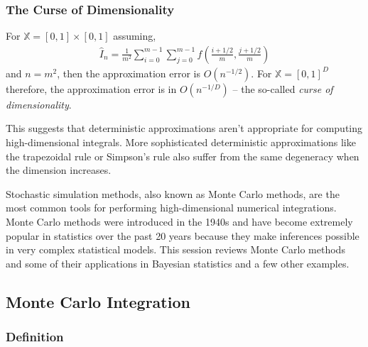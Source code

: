 \documentclass[11pt,a4paper]{article}
\begin{document}
\subsubsection{The Curse of Dimensionality}

For \(\mathbb{X}=[0,1] \times [0,1]\)
assuming,
\begin{align}
{\widehat{I}}_{n} = 
\frac{1}{m^{2}}\sum_{i = 0}^{m - 1}{\sum_{j = 0}^{m - 1}{f\left( \frac{i + 1/2}{m},\frac{j + 1/2}{m} \right)}}
\end{align}
and \(n=m^{2}\), 
then the approximation error is \(O\left( n^{- 1/2} \right)\). 
For \(\mathbb{X}=[0,1]^{D}\) therefore, 
the approximation error is in \(O\left(n^{- 1/D} \right)\) 
-- the so-called \emph{curse of dimensionality}. 

This suggests that deterministic approximations
aren't appropriate for computing high-dimensional integrals. 
More sophisticated deterministic approximations like the trapezoidal 
rule or Simpson's rule also suffer 
from the same degeneracy when the dimension increases.

Stochastic simulation methods, 
also known as Monte Carlo methods, 
are the most common tools for performing 
high-dimensional numerical integrations. 
Monte Carlo methods were introduced in the 1940s and have
become extremely popular in statistics 
over the past 20 years because
they make inferences possible in very complex statistical models. 
This session reviews Monte Carlo methods 
and some of their applications in Bayesian statistics and a few other examples.

\subsection{Monte Carlo Integration} %

\subsubsection{Definition}
\end{document}
